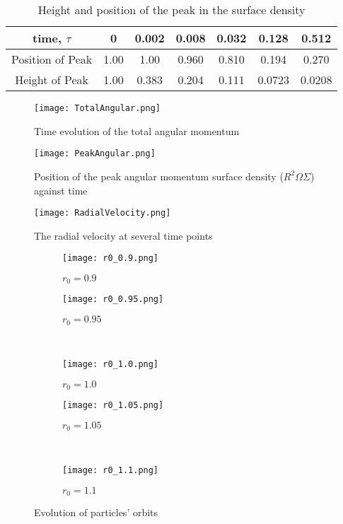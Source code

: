 \documentclass[12pt]{extarticle}
\begin{document}
\begin{table}[!htbp]
\centering
\begin{tabular}{|c|cccccc|}
\hline
\multirow{1}{8em}{time, $\tau$} & 0 & 0.002 & 0.008 & 0.032 & 0.128 & 0.512 \\
\hline
\multirow{1}{8em}{Position of Peak} & 1.00 & 1.00 & 0.960 & 0.810 & 0.194 & 0.270\\
\hline
\multirow{1}{8em}{Height of Peak} & 1.00 & 0.383 & 0.204 & 0.111 & 0.0723 & 0.0208\\
\hline
\end{tabular}
\caption{Height and position of the peak in the surface density}
\label{Table:1}
\end{table}

\begin{figure}[!htbp]
\centering
\texttt{[image: TotalAngular.png]}
\caption{Time evolution of the total angular momentum}
\label{figure:4}
\end{figure}

\begin{figure}[!htbp]
\centering
\texttt{[image: PeakAngular.png]}
\caption{Position of the peak angular momentum surface density ($R^2\Omega \Sigma$) against time}
\label{figure:5}
\end{figure}

\begin{figure}[!htbp]
\centering
\texttt{[image: RadialVelocity.png]}
\caption{The radial velocity at several time points}
\label{figure:6}
\end{figure}

\begin{figure}[!htbp]
    \centering
    \begin{subfigure}[b]{0.47\textwidth}
        \texttt{[image: r0\_0.9.png]}
        \caption{$r_0 = 0.9$}
        \label{figure:7a}
    \end{subfigure}  
    \qquad
    \begin{subfigure}[b]{0.47\textwidth}
        \texttt{[image: r0\_0.95.png]}
        \caption{$r_0 = 0.95$}
        \label{figure:7b}
    \end{subfigure} 
    \\ 
    \begin{subfigure}[b]{0.47\textwidth}
        \texttt{[image: r0\_1.0.png]}
        \caption{$r_0 = 1.0$}
        \label{figure:7c}
    \end{subfigure} 
    \qquad
    \begin{subfigure}[b]{0.47\textwidth}
        \texttt{[image: r0\_1.05.png]}
        \caption{$r_0 = 1.05$}
        \label{figure:7d}
    \end{subfigure}
      \\
    \begin{subfigure}[b]{0.47\textwidth}
        \texttt{[image: r0\_1.1.png]}
        \caption{$r_0 = 1.1$}
        \label{figure:7e}
    \end{subfigure}
    \caption{Evolution of particles' orbits}
    \label{figure 7}
\end{figure}
\end{document}
